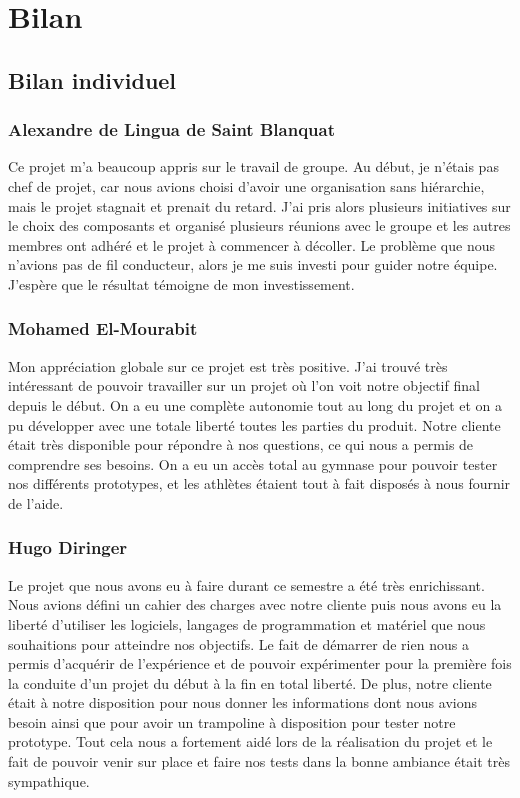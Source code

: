 \section{Bilan}
\subsection{Bilan individuel}
\subsubsection*{Alexandre de Lingua de Saint Blanquat}
Ce projet m'a beaucoup appris sur le travail de groupe. Au début, je n'étais pas chef de projet, car nous avions choisi d'avoir une organisation sans hiérarchie, mais le projet stagnait et prenait du retard. J'ai pris alors plusieurs initiatives sur le choix des composants et organisé plusieurs réunions avec le groupe et les autres membres ont adhéré et le projet à commencer à décoller. Le problème que nous n’avions pas de fil conducteur, alors je me suis investi pour guider notre équipe. J'espère que le résultat témoigne de mon investissement.

\subsubsection*{Mohamed El-Mourabit}
Mon appréciation globale sur ce projet est très positive. J'ai trouvé très intéressant de pouvoir travailler sur un projet où l'on voit notre objectif final depuis le début. On a eu une complète autonomie tout au long du projet et on a pu développer avec une totale liberté toutes les parties du produit. Notre cliente était très disponible pour répondre à nos questions, ce qui nous a permis de comprendre ses besoins. On a eu un accès total au gymnase pour pouvoir tester nos différents prototypes, et les athlètes étaient tout à fait disposés à nous fournir de l'aide.

\subsubsection*{Hugo Diringer}
Le projet que nous avons eu à faire durant ce semestre a été très enrichissant. Nous avions défini un cahier des charges avec notre cliente puis nous avons eu la liberté d'utiliser les logiciels, langages de programmation et matériel que nous souhaitions pour atteindre nos objectifs. Le fait de démarrer de rien nous a permis d'acquérir de l'expérience et de pouvoir expérimenter pour la première fois la conduite d'un projet du début à la fin en total liberté. De plus, notre cliente était à notre disposition pour nous donner les informations dont nous avions besoin ainsi que pour avoir un trampoline à disposition pour tester notre prototype. Tout cela nous a fortement aidé lors de la réalisation du projet et le fait de pouvoir venir sur place et faire nos tests dans la bonne ambiance était très sympathique. 


